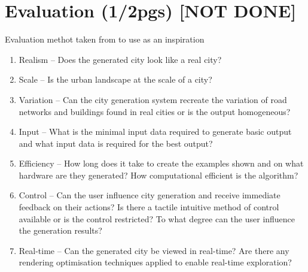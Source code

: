 
% 
% 

\section{Evaluation (1/2pgs)  [NOT DONE]}
\label{sec:evaluation}

Evaluation methot taken from \cite{Kelly} to use as an inspiration
\begin{enumerate}
	\item Realism – Does the generated city look like a real city?
	\item Scale – Is the urban landscape at the scale of a city?
	\item Variation – Can the city generation system recreate the variation of road networks and buildings found in real cities or is the output homogeneous?
	\item Input – What is the minimal input data required to generate basic output and what input data is required for the best output?
	\item Efficiency – How long does it take to create the examples shown and on what hardware are they generated? How computational efficient is the algorithm?
	\item Control – Can the user influence city generation and receive immediate feedback on their actions? Is there a tactile intuitive method of control available or is the control restricted? To what degree can the user influence the generation results?
	\item Real-time – Can the generated city be viewed in real-time? Are there any rendering optimisation techniques applied to enable real-time exploration?
\end{enumerate}
